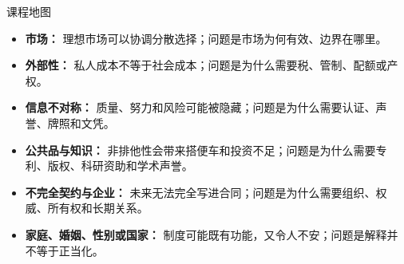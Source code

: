 \documentclass[UTF8,10pt,a4paper,scheme=chinese]{ctexart}
\begin{document}
\begin{keybox}{课程地图}
\begin{itemize}
  \item \textbf{市场：} 理想市场可以协调分散选择；问题是市场为何有效、边界在哪里。
  \item \textbf{外部性：} 私人成本不等于社会成本；问题是为什么需要税、管制、配额或产权。
  \item \textbf{信息不对称：} 质量、努力和风险可能被隐藏；问题是为什么需要认证、声誉、牌照和文凭。
  \item \textbf{公共品与知识：} 非排他性会带来搭便车和投资不足；问题是为什么需要专利、版权、科研资助和学术声誉。
  \item \textbf{不完全契约与企业：} 未来无法完全写进合同；问题是为什么需要组织、权威、所有权和长期关系。
  \item \textbf{家庭、婚姻、性别或国家：} 制度可能既有功能，又令人不安；问题是解释并不等于正当化。
\end{itemize}
\end{keybox}




\end{document}
